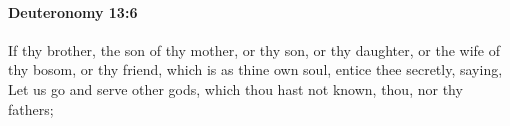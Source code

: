 
		\paragraph{Deuteronomy 13:6} %
			\label{DEUTERONOMY-13-6}

			If thy brother, the son of thy mother, or thy son, or thy daughter, or the wife of thy bosom, or thy friend, which is as thine own soul, entice thee secretly, saying, Let us go and serve other gods, which thou hast not known, thou, nor thy fathers;


